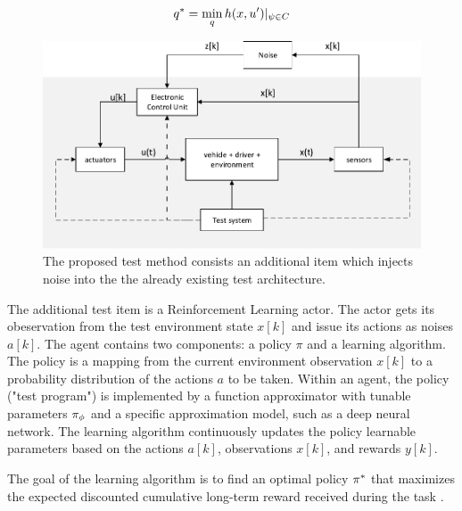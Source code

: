 \documentclass[a4paper, fleqn]{cas-dc}
\begin{document}
	\begin{align}
		q^* = \min_{q}h(x,u')|_{\psi \in C}
	\end{align}
	
	\begin{figure}[h]
		\begin{center}
			\includegraphics[scale=0.5]{figures/system3_.pdf}
			\caption{The proposed test method consists an additional item which injects noise into the the already existing test architecture.}
			\label{fig:system3}
		\end{center}
	\end{figure}
	
	The additional test item is a Reinforcement Learning actor. The actor gets its obeservation from the test environment state $x[k]$ and issue its actions as noises $a[k]$.
	The agent contains two components: a policy $\pi$ and a learning algorithm.
	The policy is a mapping from the current environment observation $x[k]$ to a probability distribution of the actions $a$ to be taken. Within an agent, the policy ("test program") is implemented by a function approximator with tunable parameters $\pi_{\phi}$ and a specific approximation model, such as a deep neural network.
	The learning algorithm continuously updates the policy learnable parameters based on the actions $a[k]$, observations $x[k]$, and rewards $y[k]$. 
	
	The goal of the learning algorithm is to find an optimal policy $\pi^*$ that maximizes the expected discounted cumulative long-term reward received during the task \cite{sutton1998reinforcement}.
	
\end{document}
